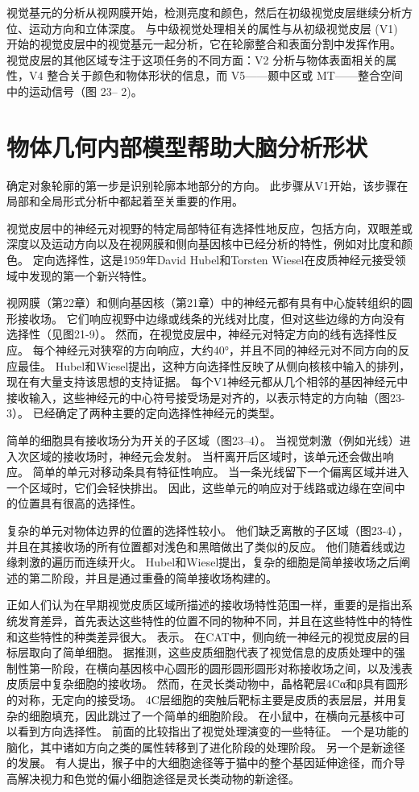 视觉基元的分析从视网膜开始，检测亮度和颜色，然后在初级视觉皮层继续分析方位、运动方向和立体深度。 与中级视觉处理相关的属性与从初级视觉皮层 (V1) 开始的视觉皮层中的视觉基元一起分析，它在轮廓整合和表面分割中发挥作用。 视觉皮层的其他区域专注于这项任务的不同方面：V2 分析与物体表面相关的属性，V4 整合关于颜色和物体形状的信息，而 V5——颞中区或 MT——整合空间中的运动信号（图 23– 2)。

\section{物体几何内部模型帮助大脑分析形状}

确定对象轮廓的第一步是识别轮廓本地部分的方向。 此步骤从V1开始，该步骤在局部和全局形式分析中都起着至关重要的作用。

视觉皮层中的神经元对视野的特定局部特征有选择性地反应，包括方向，双眼差或深度以及运动方向以及在视网膜和侧向基因核中已经分析的特性，例如对比度和颜色。 定向选择性，这是1959年David Hubel和Torsten Wiesel在皮质神经元接受领域中发现的第一个新兴特性。

视网膜（第22章）和侧向基因核（第21章）中的神经元都有具有中心旋转组织的圆形接收场。 它们响应视野中边缘或线条的光线对比度，但对这些边缘的方向没有选择性（见图21-9）。 然而，在视觉皮层中，神经元对特定方向的线有选择性反应。 每个神经元对狭窄的方向响应，大约40°，并且不同的神经元对不同方向的反应最佳。 Hubel和Wiesel提出，这种方向选择性反映了从侧向核核中输入的排列，现在有大量支持该思想的支持证据。 每个V1神经元都从几个相邻的基因神经元中接收输入，这些神经元的中心符号接受场是对齐的，以表示特定的方向轴（图23-3）。 已经确定了两种主要的定向选择性神经元的类型。

简单的细胞具有接收场分为开关的子区域（图23–4）。 当视觉刺激（例如光线）进入次区域的接收场时，神经元会发射。 当杆离开后区域时，该单元还会做出响应。 简单的单元对移动条具有特征性响应。 当一条光线留下一个偏离区域并进入一个区域时，它们会轻快排出。 因此，这些单元的响应对于线路或边缘在空间中的位置具有很高的选择性。

复杂的单元对物体边界的位置的选择性较小。 他们缺乏离散的子区域（图23-4），并且在其接收场的所有位置都对浅色和黑暗做出了类似的反应。 他们随着线或边缘刺激的遍历而连续开火。 Hubel和Wiesel提出，复杂的细胞是简单接收场之后阐述的第二阶段，并且是通过重叠的简单接收场构建的。

正如人们认为在早期视觉皮质区域所描述的接收场特性范围一样，重要的是指出系统发育差异，首先表达这些特性的位置不同的物种不同，并且在这些特性中的特性和这些特性的种类差异很大。 表示。 在CAT中，侧向统一神经元的视觉皮层的目标层取向了简单细胞。 据推测，这些皮质细胞代表了视觉信息的皮质处理中的强制性第一阶段，在横向基因核中心圆形的圆形圆形圆形对称接收场之间，以及浅表皮质层中复杂细胞的接收场。 然而，在灵长类动物中，晶格靶层4Cα和β具有圆形的对称，无定向的接受场。 4C层细胞的突触后靶标主要是皮质的表层层，并用复杂的细胞填充，因此跳过了一个简单的细胞阶段。 在小鼠中，在横向元基核中可以看到方向选择性。 前面的比较指出了视觉处理演变的一些特征。 一个是功能的脑化，其中诸如方向之类的属性转移到了进化阶段的处理阶段。 另一个是新途径的发展。 有人提出，猴子中的大细胞途径等于猫中的整个基因延伸途径，而介导高解决视力和色觉的偏小细胞途径是灵长类动物的新途径。

